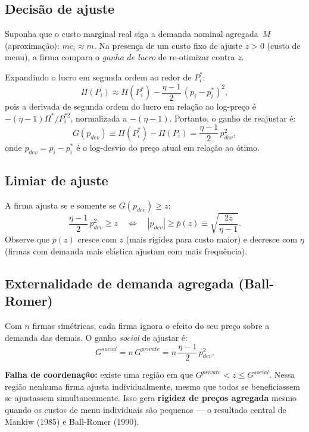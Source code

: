 \documentclass[11pt,a4paper]{article}
\begin{document}
\subsection{Decisão de ajuste}

Suponha que o custo marginal real siga a demanda nominal agregada~$M$
(aproximação): $mc_i \approx m$.  Na presença de um custo fixo de ajuste
$z > 0$ (custo de menu), a firma compara o \emph{ganho de lucro} de
re-otimizar contra $z$.

Expandindo o lucro em segunda ordem ao redor de $P_i^*$:
\begin{equation}\label{eq:profit_gain}
  \Pi(P_i) \approx \Pi(P_i^*) - \frac{\eta-1}{2}\,(p_i - p_i^*)^2,
\end{equation}
pois a derivada de segunda ordem do lucro em relação ao log-preço é
$-(\eta-1)\Pi^*/P_i^{*2}$, normalizada a $-(\eta-1)$.  Portanto, o ganho
de reajustar é:
\begin{equation}\label{eq:G}
  G(p_{dev}) \equiv \Pi(P_i^*) - \Pi(P_i) = \frac{\eta-1}{2}\,p_{dev}^2,
\end{equation}
onde $p_{dev} = p_i - p_i^*$ é o log-desvio do preço atual em relação ao
ótimo.

\subsection{Limiar de ajuste}

A firma ajusta se e somente se $G(p_{dev}) \geq z$:
\begin{equation}\label{eq:threshold}
  \frac{\eta-1}{2}\,p_{dev}^2 \geq z
  \quad\Longleftrightarrow\quad
  |p_{dev}| \geq \bar{p}(z) \equiv \sqrt{\frac{2z}{\eta-1}}.
\end{equation}
Observe que $\bar{p}(z)$ cresce com $z$ (mais rigidez para custo maior) e
decresce com $\eta$ (firmas com demanda mais elástica ajustam com mais
frequência).

\subsection{Externalidade de demanda agregada (Ball-Romer)}

Com $n$ firmas simétricas, cada firma ignora o efeito do seu preço sobre a
demanda das demais.  O ganho \emph{social} de ajustar é:
\begin{equation}
  G^{social} = n\,G^{private} = n\,\frac{\eta-1}{2}\,p_{dev}^2.
\end{equation}

\textbf{Falha de coordenação:} existe uma região em que
$G^{private} < z \leq G^{social}$.  Nessa região nenhuma firma ajusta
individualmente, mesmo que todos se beneficiassem se ajustassem
simultaneamente.  Isso gera \textbf{rigidez de preços agregada} mesmo quando
os custos de menu individuais são pequenos --- o resultado central de Mankiw
(1985) e Ball-Romer (1990).
\end{document}
